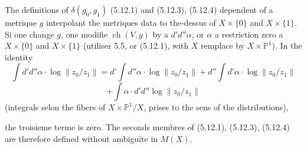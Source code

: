\documentclass[12pt,a4paper]{article}
\theoremstyle{plain}
\theoremstyle{definition}
\DeclareMathOperator{\ch}{ch}
\newcommand{\PP}{\mathbb{P}}
\begin{document}
The definitions of $\delta(g_0, g_1)$ (5.12.1) and (5.12.3), (5.12.4) dependent of a
metrique $g$ interpolant the metriques data to the-dessus of $X \times \{0\}$ and $X \times
\{1\}$. Si one change $g$, one modifie $\ch(V, g)$ by a $d'd'' \alpha$, or $\alpha$ a restriction
zero a $X \times \{0\}$ and $X \times \{1\}$ (utiliser 5.5, or (5.12.1), with $X$ remplace by
$X \times \PP^1$). In the identity
\[
\int d'd''\alpha \cdot \log\|z_0/z_1\| = d'\int d''\alpha \cdot \log\|z_0/z_1\| + d''\int d'\alpha \cdot \log\|z_0/z_1\|
\]
\[
+ \int \alpha \cdot d'd''\log\|z_0/z_1\|
\]
(integrals selon the fibers of $X \times \PP^1/X$, prises to the sens of the distributions),

the troisieme terme is zero. The seconds membres of (5.12.1), (5.12.3), (5.12.4)
are therefore defined without ambigu\"ite in $M(X)$.



\newpage
\end{document}
